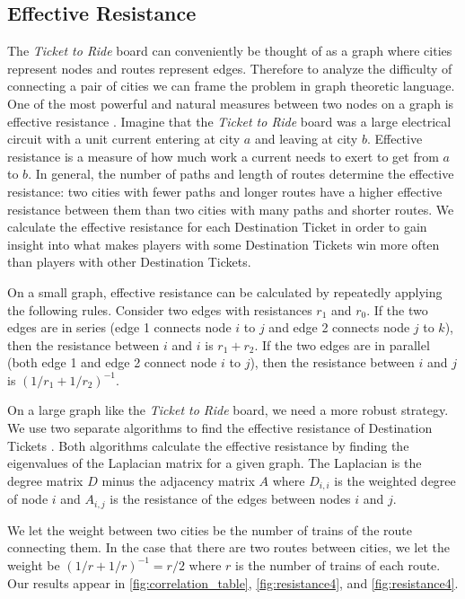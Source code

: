 \begin{multicols}{2}
\subsection{Effective Resistance}
The \textit{Ticket to Ride} board can conveniently
be thought of as a graph where cities represent
nodes and routes represent edges.
Therefore to analyze the difficulty of connecting a
pair of cities we can frame the problem in graph theoretic language.
One of the most powerful and natural measures
between two nodes on a graph is effective resistance
\cite{ellens2011effective}.
Imagine that the \textit{Ticket to Ride} board was
a large electrical circuit with a unit current
entering at city $a$ and leaving at city $b$.
Effective resistance is a measure
of how much work a current needs to exert
to get from $a$ to $b$.
In general, the number of paths and length of routes 
determine the effective resistance:
two cities with fewer paths and longer routes
have a higher effective resistance between them
than two cities with many paths and shorter routes.
We calculate the effective resistance for each 
Destination Ticket in order to gain insight
into what makes players with some Destination Tickets
win more often than players with other Destination Tickets.

On a small graph, effective resistance can be calculated
by repeatedly applying the following rules.
Consider two edges with resistances $r_1$ and $r_0$.
If the two edges are in series (edge 1 connects node $i$ to $j$
and edge 2 connects node $j$ to $k$), then the resistance between
$i$ and $i$ is $r_1 + r_2$.
If the two edges are in parallel (both edge 1 and edge 2 connect
node $i$ to $j$), then the resistance between $i$ and $j$
is $(1/r_1 + 1/r_2)^{-1}$.

On a large graph like the \textit{Ticket to Ride} board, 
we need a more robust strategy.
We use two separate algorithms to find the effective resistance
of Destination Tickets
\cite{ellens2011effective, wu2004theory}.
Both algorithms calculate the effective resistance by finding 
the eigenvalues of the Laplacian matrix for a given graph.
The Laplacian is the degree matrix $D$ minus the adjacency
matrix $A$ where $D_{i,i}$ is the weighted degree of node $i$
and $A_{i,j}$ is the resistance of the edges between nodes
$i$ and $j$.

We let the weight between two cities be the number
of trains of the route connecting them.
In the case that there are two routes between cities,
we let the weight be $(1/r + 1/r)^{-1}=r/2$ where
$r$ is the number of trains of each route.
Our results appear in \cref{fig:correlation_table},
\cref{fig:resistance4}, and \cref{fig:resistance4}.


\end{multicols}
